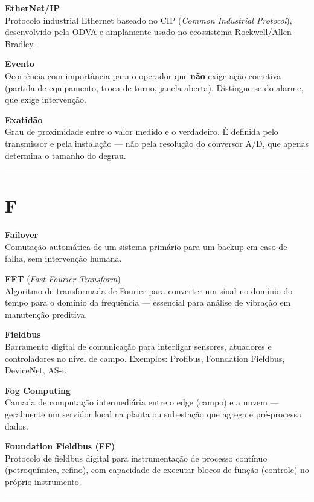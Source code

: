 \textbf{EtherNet/IP}\\
Protocolo industrial Ethernet baseado no CIP (\emph{Common Industrial Protocol}), desenvolvido pela ODVA e amplamente usado no ecossistema Rockwell/Allen-Bradley.

\textbf{Evento}\\
Ocorrência com importância para o operador que \textbf{não} exige ação corretiva (partida de equipamento, troca de turno, janela aberta). Distingue-se do alarme, que exige intervenção.

\textbf{Exatidão}\\
Grau de proximidade entre o valor medido e o verdadeiro. É definida pelo transmissor e pela instalação --- não pela resolução do conversor A/D, que apenas determina o tamanho do degrau.

\begin{center}\rule{0.5\linewidth}{0.5pt}\end{center}

\section{F}\label{f}

\textbf{Failover}\\
Comutação automática de um sistema primário para um backup em caso de falha, sem intervenção humana.

\textbf{FFT} (\emph{Fast Fourier Transform})\\
Algoritmo de transformada de Fourier para converter um sinal no domínio do tempo para o domínio da frequência --- essencial para análise de vibração em manutenção preditiva.

\textbf{Fieldbus}\\
Barramento digital de comunicação para interligar sensores, atuadores e controladores no nível de campo. Exemplos: Profibus, Foundation Fieldbus, DeviceNet, AS-i.

\textbf{Fog Computing}\\
Camada de computação intermediária entre o edge (campo) e a nuvem --- geralmente um servidor local na planta ou subestação que agrega e pré-processa dados.

\textbf{Foundation Fieldbus (FF)}\\
Protocolo de fieldbus digital para instrumentação de processo contínuo (petroquímica, refino), com capacidade de executar blocos de função (controle) no próprio instrumento.

\begin{center}\rule{0.5\linewidth}{0.5pt}\end{center}

